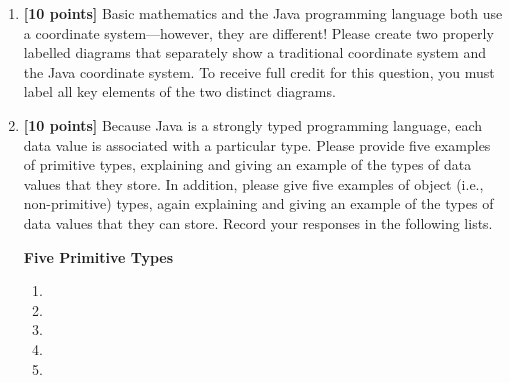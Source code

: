 \documentclass[11pt]{report}
\begin{document}
\begin{enumerate}
\begin{enumerate}
\begin{verbatim}
     
     
     
     
\end{verbatim}
\item \mbox{}

\begin{verbatim}
     Random r = new Random;
     
     
     
     
     
\end{verbatim}
\item \mbox{}

\begin{verbatim}
     int i = 17 / (double) 10;
     
     
     
     
     
\end{verbatim}

\item \mbox{}

\begin{verbatim}
     Import java.util.ArrayList;
     
     
     
     
     
\end{verbatim}
\end{enumerate}

\item{\bf [10 points]} Basic mathematics and the Java programming language both use a coordinate system---however, they
  are different! Please create two properly labelled diagrams that separately show a traditional coordinate system and
  the Java coordinate system. To receive full credit for this question, you must label all key elements of the two
  distinct diagrams.

  \vspace*{1.1in}

\item{\bf [10 points]} Because Java is a strongly typed programming language, each data value is associated with a
  particular type. Please provide five examples of primitive types, explaining and giving an example of the types of
  data values that they store.  In addition, please give five examples of object (i.e., non-primitive) types, again
  explaining and giving an example of the types of data values that they can store. Record your responses in the
  following lists.

  {\bf Five Primitive Types}
  \begin{enumerate}
  \setlength{\itemsep}{.25in}
    \item 
    \item 
    \item
    \item
    \item
  \end{enumerate}


\end{enumerate}
\end{document}
